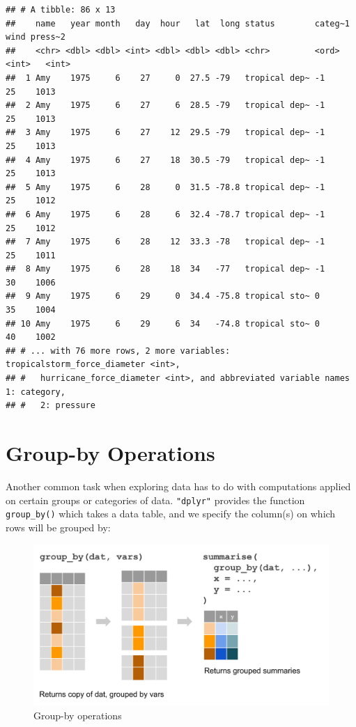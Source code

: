 \documentclass[
]{book}
\begin{document}
\begin{verbatim}
## # A tibble: 86 x 13
##    name   year month   day  hour   lat  long status        categ~1  wind press~2
##    <chr> <dbl> <dbl> <int> <dbl> <dbl> <dbl> <chr>         <ord>   <int>   <int>
##  1 Amy    1975     6    27     0  27.5 -79   tropical dep~ -1         25    1013
##  2 Amy    1975     6    27     6  28.5 -79   tropical dep~ -1         25    1013
##  3 Amy    1975     6    27    12  29.5 -79   tropical dep~ -1         25    1013
##  4 Amy    1975     6    27    18  30.5 -79   tropical dep~ -1         25    1013
##  5 Amy    1975     6    28     0  31.5 -78.8 tropical dep~ -1         25    1012
##  6 Amy    1975     6    28     6  32.4 -78.7 tropical dep~ -1         25    1012
##  7 Amy    1975     6    28    12  33.3 -78   tropical dep~ -1         25    1011
##  8 Amy    1975     6    28    18  34   -77   tropical dep~ -1         30    1006
##  9 Amy    1975     6    29     0  34.4 -75.8 tropical sto~ 0          35    1004
## 10 Amy    1975     6    29     6  34   -74.8 tropical sto~ 0          40    1002
## # ... with 76 more rows, 2 more variables: tropicalstorm_force_diameter <int>,
## #   hurricane_force_diameter <int>, and abbreviated variable names 1: category,
## #   2: pressure
\end{verbatim}

\hypertarget{group-by-operations}{%
\section{Group-by Operations}\label{group-by-operations}}

Another common task when exploring data has to do with computations applied
on certain groups or categories of data. \texttt{"dplyr"} provides the function
\texttt{group\_by()} which takes a data table, and we specify the column(s) on which
rows will be grouped by:

\begin{figure}

{\centering \includegraphics[width=0.8\linewidth]{images/dplyr-group-by} 

}

\caption{Group-by operations}\label{fig:unnamed-chunk-23}
\end{figure}
\end{document}
